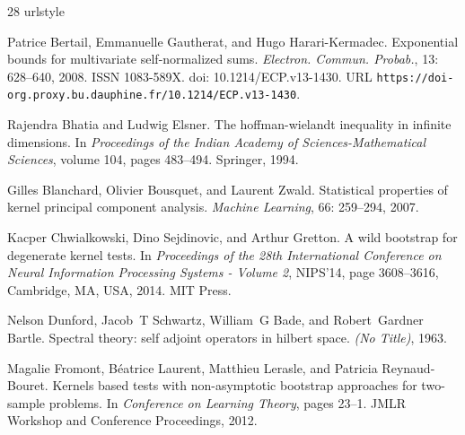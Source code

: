 \documentclass[twoside,11pt]{article}
\begin{document}
\begin{thebibliography}{28}
	\providecommand{\natexlab}[1]{#1}
	\providecommand{\url}[1]{\texttt{#1}}
	\expandafter\ifx\csname urlstyle\endcsname\relax
	\providecommand{\doi}[1]{doi: #1}\else
	\providecommand{\doi}{doi: \begingroup \urlstyle{rm}\Url}\fi
	
	Patrice Bertail, Emmanuelle Gautherat, and Hugo Harari-Kermadec.
	\newblock Exponential bounds for multivariate self-normalized sums.
	\newblock \emph{Electron. Commun. Probab.}, 13: 628--640, 2008.
	\newblock ISSN 1083-589X.
	\newblock \doi{10.1214/ECP.v13-1430}.
	\newblock URL \url{https://doi-org.proxy.bu.dauphine.fr/10.1214/ECP.v13-1430}.
	
	Rajendra Bhatia and Ludwig Elsner.
	\newblock The hoffman-wielandt inequality in infinite dimensions.
	\newblock In \emph{Proceedings of the Indian Academy of Sciences-Mathematical
		Sciences}, volume 104, pages 483--494. Springer, 1994.
	
	Gilles Blanchard, Olivier Bousquet, and Laurent Zwald.
	\newblock Statistical properties of kernel principal component analysis.
	\newblock \emph{Machine Learning}, 66: 259--294, 2007.
	
	Kacper Chwialkowski, Dino Sejdinovic, and Arthur Gretton.
	\newblock A wild bootstrap for degenerate kernel tests.
	\newblock In \emph{Proceedings of the 28th International Conference on Neural
		Information Processing Systems - Volume 2}, NIPS'14, page 3608–3616,
	Cambridge, MA, USA, 2014. MIT Press.
	
	Nelson Dunford, Jacob~T Schwartz, William~G Bade, and Robert~Gardner Bartle.
	\newblock Spectral theory: self adjoint operators in hilbert space.
	\newblock \emph{(No Title)}, 1963.
	
	Magalie Fromont, B{\'e}atrice Laurent, Matthieu Lerasle, and Patricia
	Reynaud-Bouret.
	\newblock Kernels based tests with non-asymptotic bootstrap approaches for
	two-sample problems.
	\newblock In \emph{Conference on Learning Theory}, pages 23--1. JMLR Workshop
	and Conference Proceedings, 2012.
	

\end{thebibliography}
\end{document}
